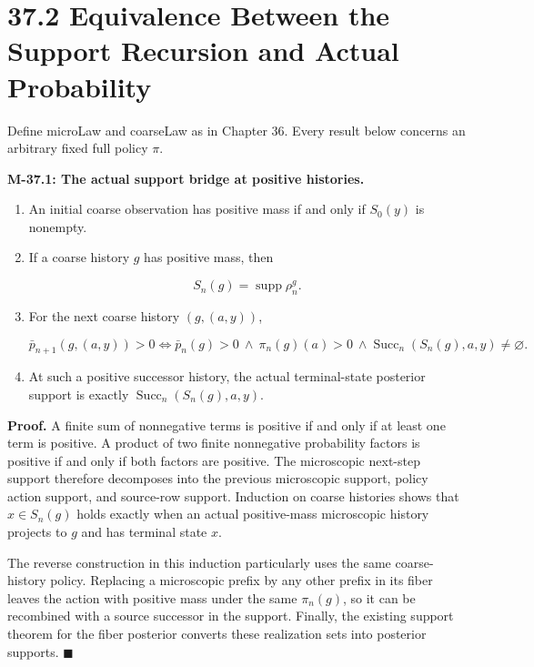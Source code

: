 \documentclass[
  english,
  11pt,
  oneside]{book}
\newcounter{none} %
\begin{document}
\section{37.2 Equivalence Between the Support Recursion and Actual Probability}\label{equivalence-between-the-support-recursion-and-actual-probability}

Define microLaw and coarseLaw as in Chapter 36. Every result below concerns an arbitrary fixed full policy \(\pi\).

\hypertarget{m-37-1}{}\label{m-37-1}

\textbf{M-37.1: The actual support bridge at positive histories.}

\begin{enumerate}
\def\labelenumi{\arabic{enumi}.}
\item
  An initial coarse observation has positive mass if and only if \(S_0(y)\) is nonempty.
\item
  If a coarse history \(g\) has positive mass, then

  \[S_n(g)=\operatorname{supp}\rho_n^g.\]
\item
  For the next coarse history \((g,(a,y))\),

  \[\bar p_{n+1}(g,(a,y))>0
  \iff
  \bar p_n(g)>0\ \land\ \pi_n(g)(a)>0\
  \land\operatorname{Succ}_n(S_n(g),a,y)\ne\varnothing.\]
\item
  At such a positive successor history, the actual terminal-state posterior support is exactly \(\operatorname{Succ}_n(S_n(g),a,y)\).
\end{enumerate}

\textbf{Proof.} A finite sum of nonnegative terms is positive if and only if at least one term is positive. A product of two finite nonnegative probability factors is positive if and only if both factors are positive. The microscopic next-step support therefore decomposes into the previous microscopic support, policy action support, and source-row support. Induction on coarse histories shows that \(x\in S_n(g)\) holds exactly when an actual positive-mass microscopic history projects to \(g\) and has terminal state \(x\).

The reverse construction in this induction particularly uses the same coarse-history policy. Replacing a microscopic prefix by any other prefix in its fiber leaves the action with positive mass under the same \(\pi_n(g)\), so it can be recombined with a source successor in the support. Finally, the existing support theorem for the fiber posterior converts these realization sets into posterior supports. \(\blacksquare\)
\end{document}
